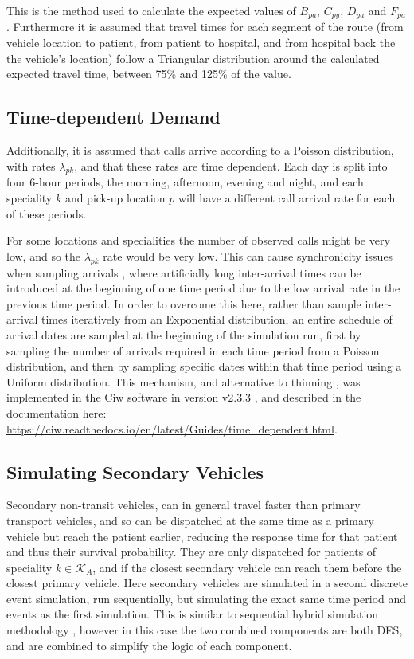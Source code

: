 \documentclass[preprint,12pt]{elsarticle}
\begin{document}
This is the method used to calculate the expected values of $B_{pa}$, $C_{py}$,
$D_{ya}$ and $F_{pa}$.
Furthermore it is assumed that travel times for each segment of the route
(from vehicle location to patient, from patient to hospital, and from hospital
back the the vehicle's location) follow a Triangular distribution around the
calculated expected travel time, between 75\% and 125\% of the value.


\subsection{Time-dependent Demand}
Additionally, it is assumed that calls arrive according to a Poisson
distribution, with rates $\lambda_{pk}$, and that these rates are time
dependent. Each day is split into four 6-hour periods, the morning, afternoon,
evening and night, and each speciality $k$ and pick-up location $p$ will have
a different call arrival rate for each of these periods.

For some locations and specialities the number of observed calls might be very
low, and so the $\lambda_{pk}$ rate would be very low. This can cause
synchronicity issues when sampling arrivals \citep{pidd2004computer}, where
artificially long inter-arrival times can be introduced at the beginning of
one time period due to the low arrival rate in the previous time period.
In order to overcome this here, rather than sample inter-arrival times
iteratively from an Exponential distribution, an entire schedule of arrival
dates are sampled at the beginning of the simulation run, first by sampling
the number of arrivals required in each time period from a Poisson
distribution, and then by sampling specific dates within that time period
using a Uniform distribution.
This mechanism, and alternative to thinning \cite{lewisshedler79}, was
implemented in the Ciw software in version v2.3.3 \cite{ciw233}, and described
in the documentation here:
\url{https://ciw.readthedocs.io/en/latest/Guides/time_dependent.html}.


\subsection{Simulating Secondary Vehicles}\label{sec:simulation_secondary}
Secondary non-transit vehicles, can in general travel faster than primary
transport vehicles, and so can be dispatched at the same time as a primary
vehicle but reach the patient earlier, reducing the response time for that
patient and thus their survival probability. They are only dispatched for
patients of speciality $k \in \mathcal{K}_A$, and if the closest secondary
vehicle can reach them before the closest primary vehicle.
Here secondary vehicles are simulated in a second discrete event simulation,
run sequentially, but simulating the exact same time period and events as the
first simulation. This is similar to sequential hybrid simulation methodology
\cite{brailsfordetal19, morganetal17}, however in this case the two combined
components are both DES, and are combined to simplify the logic of each
component.
\end{document}
